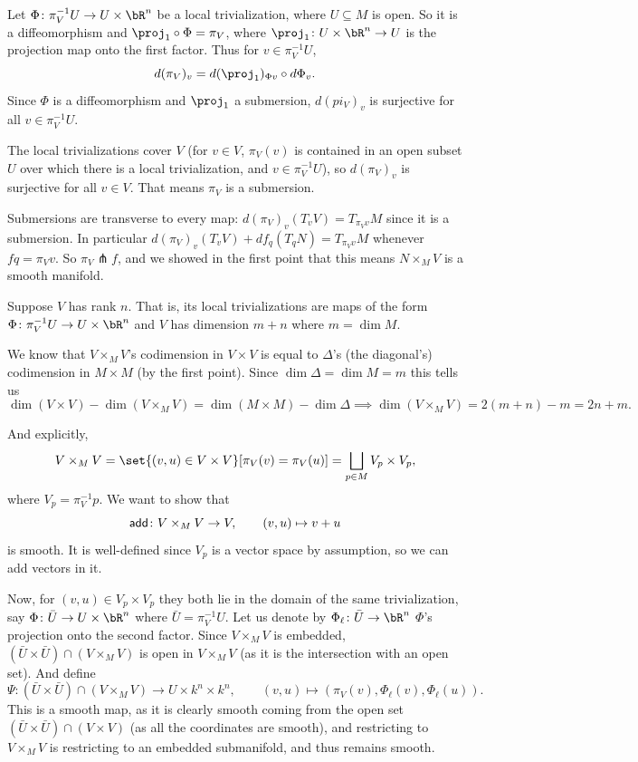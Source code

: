     \item Let $\Phi\colon\pi_V^{-1}U\to U\times\bR^n$ be a local trivialization, where $U\subseteq M$ is open.
    So it is a diffeomorphism and $\proj_1\circ\Phi=\pi_V$, where $\proj_1\colon U\times\bR^n\to U$ is the projection map
    onto the first factor.
    Thus for $v\in\pi_V^{-1}U$,
    $$ d(\pi_V)_v = d(\proj_1)_{\Phi v}\circ d\Phi_v . $$
    Since $\Phi$ is a diffeomorphism and $\proj_1$ a submersion, $d(pi_V)_v$ is surjective for all $v\in\pi_V^{-1}U$.

    The local trivializations cover $V$ (for $v\in V$, $\pi_V(v)$ is contained in an open subset $U$ over which there is
    a local trivialization, and $v\in\pi_V^{-1}U$), so $d(\pi_V)_v$ is surjective for all $v\in V$.
    That means $\pi_V$ is a submersion.

    \item Submersions are transverse to every map: $d(\pi_V)_v(T_vV)=T_{\pi_Vv}M$ since it is a submersion.
    In particular $d(\pi_V)_v(T_vV)+df_q(T_qN)=T_{\pi_Vv}M$ whenever $fq=\pi_Vv$.
    So $\pi_V\pitchfork f$, and we showed in the first point that this means $N\times_MV$ is a smooth manifold.

    \item\def\add{{\sf add}}
    Suppose $V$ has rank $n$.
    That is, its local trivializations are maps of the form $\Phi\colon\pi_V^{-1}U\to U\times\bR^n$ and $V$ has dimension
    $m+n$ where $m=\dim M$.

    We know that $V\times_MV$'s codimension in $V\times V$ is equal to $\Delta$'s (the diagonal's) codimension in
    $M\times M$ (by the first point).
    Since $\dim\Delta=\dim M=m$ this tells us
    $$ \dim(V\times V) - \dim(V\times_MV) = \dim(M\times M) - \dim\Delta \implies \dim(V\times_MV) = 2(m+n) - m = 2n+m . $$

    And explicitly,
    $$ V\times_MV = \set{(v,u)\in V\times V}[\pi_V(v)=\pi_V(u)] = \bigsqcup_{p\in M}V_p\times V_p , $$
    where $V_p=\pi_V^{-1}p$.
    We want to show that
    $$ \add\colon V\times_MV\to V,\qquad (v,u)\mapsto v+u $$
    is smooth.
    It is well-defined since $V_p$ is a vector space by assumption, so we can add vectors in it.

    Now, for $(v,u)\in V_p\times V_p$ they both lie in the domain of the same trivialization, say
    $\Phi\colon\bar U\to U\times\bR^n$ where $\bar U=\pi_V^{-1}U$.
    Let us denote by $\Phi_\ell\colon\bar U\to\bR^n$ $\Phi$'s projection onto the second factor.
    Since $V\times_MV$ is embedded, $(\bar U\times\bar U)\cap(V\times_MV)$ is open in $V\times_MV$ (as it is the intersection
    with an open set).
    And define
    $$ \Psi\colon(\bar U\times\bar U)\cap(V\times_MV) \to U\times k^n\times k^n,\qquad
    (v,u)\mapsto(\pi_V(v),\Phi_\ell(v),\Phi_\ell(u)) . $$
    This is a smooth map, as it is clearly smooth coming from the open set $(\bar U\times\bar U)\cap(V\times V)$ (as all
    the coordinates are smooth), and restricting to $V\times_MV$ is restricting to an embedded submanifold, and thus remains
    smooth.

